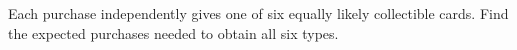 Each purchase independently gives one of six equally likely collectible cards. Find the expected purchases needed to obtain all six types.
